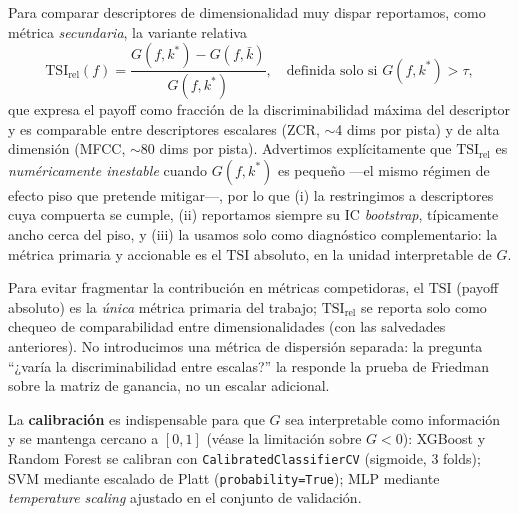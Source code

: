\documentclass[conference]{IEEEtran}
\begin{document}
Para comparar descriptores de dimensionalidad muy dispar reportamos, como métrica \emph{secundaria}, la variante relativa
\begin{equation}
    \mathrm{TSI}_{\mathrm{rel}}(f) = \frac{G(f,k^*)-G(f,\bar{k})}{G(f,k^*)},
    \quad \text{definida solo si } G(f,k^*)>\tau,
\label{eq:tsirel}
\end{equation}
que expresa el payoff como fracción de la discriminabilidad máxima del descriptor y es comparable entre descriptores escalares (ZCR, $\sim$4 dims por pista) y de alta dimensión (MFCC, $\sim$80 dims por pista). Advertimos explícitamente que $\mathrm{TSI}_{\mathrm{rel}}$ es \emph{numéricamente inestable} cuando $G(f,k^*)$ es pequeño ---el mismo régimen de efecto piso que pretende mitigar---, por lo que (i) la restringimos a descriptores cuya compuerta se cumple, (ii) reportamos siempre su IC \textit{bootstrap}, típicamente ancho cerca del piso, y (iii) la usamos solo como diagnóstico complementario: la métrica primaria y accionable es el $\mathrm{TSI}$ absoluto, en la unidad interpretable de $G$.


Para evitar fragmentar la contribución en métricas competidoras, el $\mathrm{TSI}$ (payoff absoluto) es la \emph{única} métrica primaria del trabajo; $\mathrm{TSI}_{\mathrm{rel}}$ se reporta solo como chequeo de comparabilidad entre dimensionalidades (con las salvedades anteriores). No introducimos una métrica de dispersión separada: la pregunta ``¿varía la discriminabilidad entre escalas?'' la responde la prueba de Friedman sobre la matriz de ganancia, no un escalar adicional.

La \textbf{calibración} es indispensable para que $G$ sea interpretable como información y se mantenga cercano a $[0,1]$ (véase la limitación sobre $G<0$): XGBoost y Random Forest se calibran con \texttt{CalibratedClassifierCV} (sigmoide, 3 folds); SVM mediante escalado de Platt (\texttt{probability=True}); MLP mediante \textit{temperature scaling} ajustado en el conjunto de validación.
\end{document}
